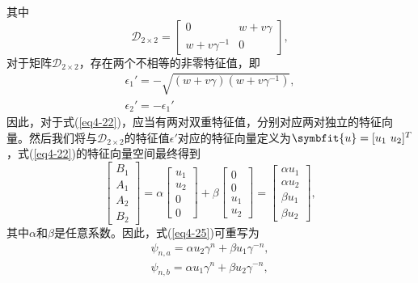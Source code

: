 其中
\begin{equation}\label{eq4-23}
    \mathcal{D}_{2\times2}=\begin{bmatrix}0&w + v\gamma\\w + v\gamma^{-1}&0\end{bmatrix},
\end{equation}
对于矩阵\(\mathcal{D}_{2\times2}\)，存在两个不相等的非零特征值，即
\begin{equation}\label{eq4-24}
    \begin{split}
        \epsilon_{1}' = -\sqrt{(w + v\gamma)(w + v\gamma^{-1})},\\
        \epsilon_{2}' = -\epsilon_{1}'
    \end{split}
\end{equation}
因此，对于式(\ref{eq4-22})，应当有两对双重特征值，分别对应两对独立的特征向量。然后我们将与\(\mathcal{D}_{2\times2}\)的特征值\(\epsilon'\)对应的特征向量定义为\(\symbfit{u} = [u_{1}\ u_{2}]^{T}\)，式(\ref{eq4-22})的特征向量空间最终得到
\begin{equation}\label{eq4-25}
    \begin{bmatrix}B_{1}\\A_{1}\\A_{2}\\B_{2}\end{bmatrix}=\alpha\begin{bmatrix}u_{1}\\u_{2}\\0\\0\end{bmatrix}+\beta\begin{bmatrix}0\\0\\u_{1}\\u_{2}\end{bmatrix}=\begin{bmatrix}\alpha u_{1}\\\alpha u_{2}\\\beta u_{1}\\\beta u_{2}\end{bmatrix},
\end{equation}
其中\(\alpha\)和\(\beta\)是任意系数。因此，式(\ref{eq4-25})可重写为
\begin{equation}\label{eq4-26}
    \begin{split}
        \psi_{n,a}=\alpha u_{2}\gamma^{n}+\beta u_{1}\gamma^{-n},\\
        \psi_{n,b}=\alpha u_{1}\gamma^{n}+\beta u_{2}\gamma^{-n},
    \end{split}
\end{equation}
